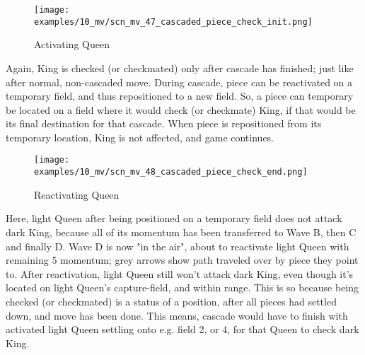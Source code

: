 \vspace*{-1.4\baselineskip}
\noindent
\begin{figure}[!h]
\texttt{[image: examples/10\_mv/scn\_mv\_47\_cascaded\_piece\_check\_init.png]}
\caption{Activating Queen}
\label{fig:scn_mv_47_cascaded_piece_check_init}
\end{figure}

Again, King is checked (or checkmated) only after cascade has finished; just like
after normal, non-cascaded move. During cascade, piece can be reactivated on a
temporary field, and thus repositioned to a new field. So, a piece can temporary
be located on a field where it would check (or checkmate) King, if that would be
its final destination for that cascade. When piece is repositioned from its
temporary location, King is not affected, and game continues.

\clearpage %

\vspace*{-2.3\baselineskip}
\noindent
\begin{figure}[!h]
\texttt{[image: examples/10\_mv/scn\_mv\_48\_cascaded\_piece\_check\_end.png]}
\vspace*{-1.3\baselineskip}
\caption{Reactivating Queen}
\label{fig:scn_mv_48_cascaded_piece_check_end}
\end{figure}

\vspace*{-0.3\baselineskip}
Here, light Queen after being positioned on a temporary field does not attack dark
King, because all of its momentum has been transferred to Wave B, then C and finally
D. Wave D is now "in the air", about to reactivate light Queen with remaining 5
momentum; grey arrows show path traveled over by piece they point to. After
reactivation, light Queen still won't attack dark King, even though it's located on
light Queen's capture-field, and within range. This is so because being checked (or
checkmated) is a status of a position, after all pieces had settled down, and move
has been done. This means, cascade would have to finish with activated light Queen
settling onto e.g. field 2, or 4, for that Queen to check dark King.

\clearpage %

